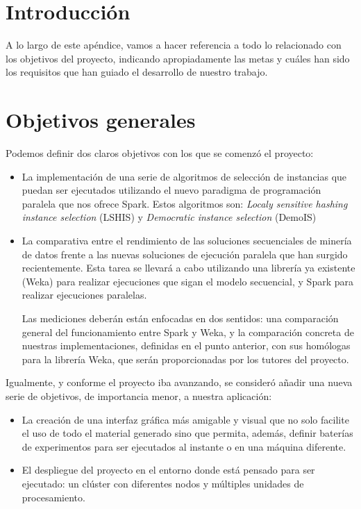 

\section{Introducción}

A lo largo de este apéndice, vamos a hacer referencia a todo lo relacionado con los objetivos del proyecto, indicando apropiadamente las metas y cuáles han sido los requisitos que han guiado el desarrollo de nuestro trabajo.

\section{Objetivos generales}

Podemos definir dos claros objetivos con los que se comenzó el proyecto:
\begin{itemize}

\item La implementación de una serie de algoritmos de selección de instancias que puedan ser ejecutados utilizando el nuevo paradigma de programación paralela que nos ofrece Spark. Estos algoritmos son: \textit{Localy sensitive hashing instance selection} (LSHIS) \cite{LSHISPaper} y \textit{Democratic instance selection} (DemoIS) \cite{DemoISPaper}

\item La comparativa entre el rendimiento de las soluciones secuenciales de minería de datos frente a las nuevas soluciones de ejecución paralela que han surgido recientemente. Esta tarea se llevará a cabo utilizando una librería ya existente (Weka) para realizar ejecuciones que sigan el modelo secuencial, y Spark para realizar ejecuciones paralelas.

Las mediciones deberán están enfocadas en dos sentidos: una comparación general del funcionamiento entre Spark y Weka, y la comparación concreta de nuestras implementaciones, definidas en el punto anterior, con sus homólogas para la librería Weka, que serán proporcionadas por los tutores del proyecto.
\end{itemize}

Igualmente, y conforme el proyecto iba avanzando, se consideró añadir una nueva serie de objetivos, de importancia menor, a nuestra aplicación:

\begin{itemize}
\item La creación de una interfaz gráfica más amigable y visual que no solo facilite el uso de todo el material generado sino que permita, además, definir baterías de experimentos para ser ejecutados al instante o en una máquina diferente.
\item El despliegue del proyecto en el entorno donde está pensado para ser ejecutado: un clúster con diferentes nodos y múltiples unidades de procesamiento.
\end{itemize}

